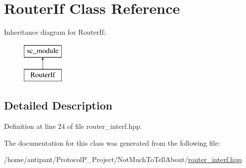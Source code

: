 \hypertarget{classRouterIf}{\section{Router\-If Class Reference}
\label{classRouterIf}
}
Inheritance diagram for Router\-If\-:\begin{figure}[H]
\begin{center}
\leavevmode
\includegraphics[height=2.000000cm]{classRouterIf}
\end{center}
\end{figure}


\subsection{Detailed Description}


Definition at line 24 of file router\-\_\-interf.\-hpp.



The documentation for this class was generated from the following file\-:\begin{DoxyCompactItemize}
\item 
/home/antipant/\-Protocol\-P\-\_\-\-Project/\-Not\-Much\-To\-Tell\-About/\hyperlink{router__interf_8hpp}{router\-\_\-interf.\-hpp}\end{DoxyCompactItemize}
